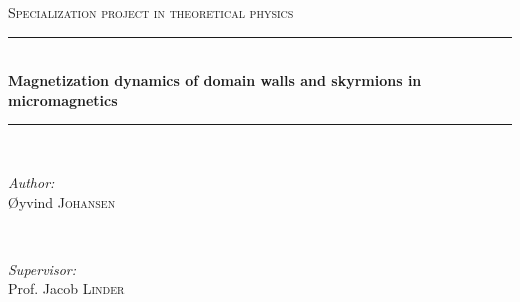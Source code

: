 \documentclass[12pt, a4paper]{article}		%
\numberwithin{equation}{section}
\begin{document}
\begin{titlepage}

\newcommand{\HRule}{\rule{\linewidth}{0.5mm}} %

\center %
 

\textsc{\Large Specialization project in theoretical physics}\\[0.5cm] %


\HRule \\[0.4cm]
{ \huge \bfseries Magnetization dynamics of domain walls and skyrmions in micromagnetics}\\[0.4cm] %
\HRule \\[1.5cm]
 

\begin{minipage}{0.4\textwidth}
\begin{flushleft} \large
\emph{Author:}\\
\O yvind \textsc{Johansen} %
\end{flushleft}
\end{minipage}
~
\begin{minipage}{0.4\textwidth}
\begin{flushright} \large
\emph{Supervisor:} \\
Prof. Jacob \textsc{Linder} %
\end{flushright}
\end{minipage}\\[4cm]


\end{titlepage}
\end{document}
